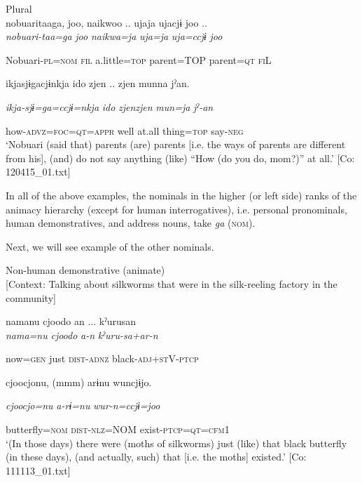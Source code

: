 \begin{table}
\ex  Plural\\

{\TM}
\glll nobuaritaaga,  joo,  naikwoo ..  ujaja  ujacjɨ  joo ..\\

      \textit{nobuari-taa=ga}  \textit{joo}  \textit{naikwa=ja}  \textit{uja=ja}  \textit{uja=ccjɨ}  \textit{joo}

      Nobuari-\textsc{pl}=\textsc{nom}  \textsc{fil}  a.little=\textsc{top}  parent=TOP  parent=\textsc{qt}  \textsc{fi}L

      ikjasjɨgacjɨnkja  ido  zjen .. zjen  munna  jˀan.

      \textit{ikja-sjɨ=ga=ccjɨ=nkja}  \textit{ido}  \textit{zjenzjen}  \textit{mun=ja}  \textit{jˀ-an}

      how-\textsc{advz}=\textsc{foc}=\textsc{qt}=\textsc{appr}  well  at.all  thing=\textsc{top}  say-\textsc{neg}\\
\glt ‘Nobuari (said that) parents (are) parents [i.e. the ways of parents are different from his], (and) do not say anything (like) “How (do you do, mom?)” at all.’ [Co: 120415\_01.txt]
\z

In all of the above examples, the nominals in the higher (or left side) ranks of the animacy hierarchy (except for human interrogatives), i.e. personal pronominals, human demonstratives, and address nouns, take \textit{ga} (\textsc{nom}).

  Next, we will see example of the other nominals.

\ea\label{ex:6-118}
\ea Non-human demonstrative (animate)\\{}
[Context: Talking about silkworms that were in the silk-reeling factory in the community]

{\TM}
\glll namanu  cjoodo  an ...  kˀurusan\\

      \textit{nama=nu}  \textit{cjoodo}  \textit{a-n}  \textit{kˀuru-sa+ar-n}

      now=\textsc{gen}  just  \textsc{dist}-\textsc{adnz}  black-\textsc{adj}+\textsc{st}V-\textsc{ptcp}

      cjoocjonu,  (mmm)  arɨnu  wuncjɨjo.

      \textit{cjoocjo=nu}    \textit{a-rɨ=nu}  \textit{wur-n=ccjɨ=joo}

      butterfly=\textsc{nom}    \textsc{dist}-\textsc{nlz}=NOM  exist-\textsc{ptcp}=\textsc{qt}=\textsc{cfm}1\\
\glt ‘(In those days) there were (moths of silkworms) just (like) that black butterfly (in these days), (and actually, such) that [i.e. the moths] existed.’ [Co: 111113\_01.txt]
\z


\end{table}
